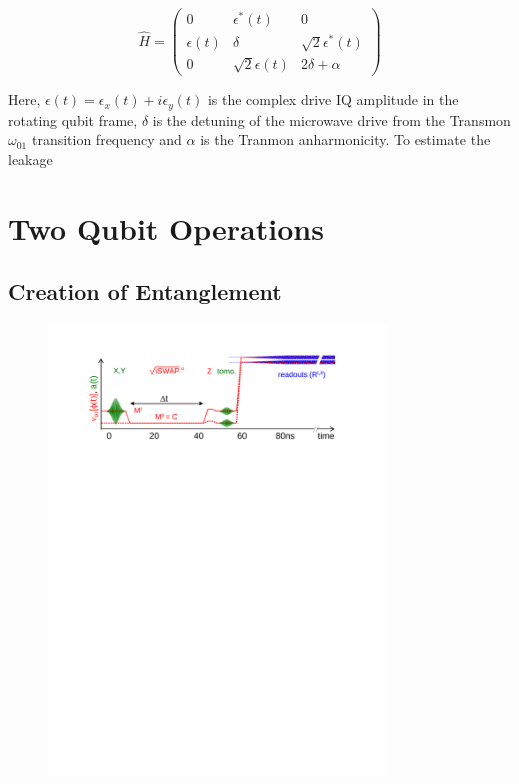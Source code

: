 \begin{equation}
\hat{H} = \left(
						 \begin{array}{ccc}
						0 & \epsilon^*(t) & 0 \\
						\epsilon(t) & \delta & \sqrt{2}\epsilon^*(t) \\
						0 & \sqrt{2}\epsilon(t) & 2\delta + \alpha
						\end{array}
					\right)
\end{equation}

Here, $\epsilon(t) = \epsilon_x(t)+i\epsilon_y(t)$ is the complex drive IQ amplitude in the rotating qubit frame, $\delta$ is the detuning of the microwave drive from the Transmon $\omega_{01}$ transition frequency and $\alpha$ is the Tranmon anharmonicity. To estimate the leakage

\section{Two Qubit Operations}

\subsection{Creation of Entanglement}

\begin{figure}
	\centering
		\includegraphics[width=0.8\textwidth]{./material/papers/iswap/figures/iswap_gate_pulse_sequence}
	\label{fig:ISwapPulseSequence}
	\caption{}
\end{figure}

